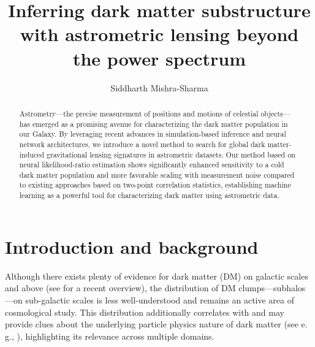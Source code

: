 \documentclass[twocolumn,linenumbers]{aastex631}
\newcommand{\eg}{{e.\,g.}\xspace}
\begin{document}
\sloppy\sloppypar\raggedbottom\frenchspacing

\title{Inferring dark matter substructure with astrometric lensing beyond the power spectrum}

\author[0000-0001-9088-7845]{Siddharth Mishra-Sharma}

\begin{abstract}\noindent
Astrometry---the precise measurement of positions and motions of celestial objects---has emerged as a promising avenue for characterizing the dark matter population in our Galaxy. By leveraging recent advances in simulation-based inference and neural network architectures, we introduce a novel method to search for global dark matter-induced gravitational lensing signatures in astrometric datasets. Our method based on neural likelihood-ratio estimation shows significantly enhanced sensitivity to a cold dark matter population and more favorable scaling with measurement noise compared to existing approaches based on two-point correlation statistics, establishing machine learning as a powerful tool for characterizing dark matter using astrometric data. 
\end{abstract}


\section{Introduction and background}
\label{sec:intro}

Although there exists plenty of evidence for dark matter (DM) on galactic scales and above (see \citet{Green:2021jrr} for a recent overview), the distribution of DM clumps---subhalos---on sub-galactic scales is less well-understood and remains an active area of cosmological study. This distribution additionally correlates with and may provide clues about the underlying particle physics nature of dark matter (see \eg, \citet{Schutz:2020jox,Bode:2000gq,Dalcanton:2000hn}), highlighting its relevance across multiple domains.
\end{document}
